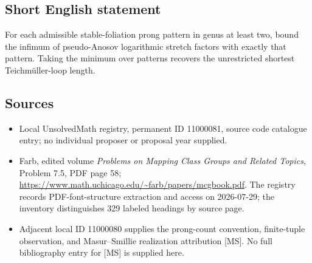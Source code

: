 \documentclass[11pt]{article}
\begin{document}
\subsection{Short English statement}
For each admissible stable-foliation prong pattern in genus at least two, bound the infimum of pseudo-Anosov logarithmic stretch factors with exactly that pattern. Taking the minimum over patterns recovers the unrestricted shortest Teichm\"uller-loop length.
\subsection{Sources}
\begin{itemize}
\item Local UnsolvedMath registry, permanent ID 11000081, source code catalogue entry; no individual proposer or proposal year supplied.
\item Farb, edited volume \emph{Problems on Mapping Class Groups and Related Topics}, Problem 7.5, PDF page 58; \url{https://www.math.uchicago.edu/~farb/papers/mcgbook.pdf}. The registry records PDF-font-structure extraction and access on 2026-07-29; the inventory distinguishes 329 labeled headings by source page.
\item Adjacent local ID 11000080 supplies the prong-count convention, finite-tuple observation, and Masur--Smillie realization attribution [MS]. No full bibliography entry for [MS] is supplied here.
\end{itemize}
\end{document}
